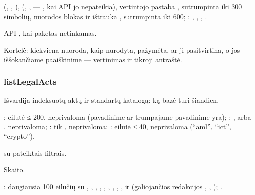\begin{description}[style=multiline, leftmargin=19mm, labelwidth=17mm, labelsep=2mm,
  font=\sffamily\bfseries\footnotesize\color{ink}, itemsep=1pt, topsep=2pt, before=\raggedright]
    (, , ), 
    (, ,  --- , kai API jo nepateikia),
    vertintojo pastaba , sutrumpinta iki 300 simbolių, nuorodos blokas ir ištrauka
    , sutrumpinta iki 600; : , ,
    , .
  \item[Klaidos] API , kai paketas netinkamas.
  \item[Konsolė] Kortelė: kiekviena nuoroda, kaip nurodyta, pažymėta, ar ji pasitvirtina, o
    jos iššokančiame paaiškinime --- vertinimas ir tikroji antraštė.
\end{description}

\subsubsection{listLegalActs}\label{sec:tools:listLegalActs}
\begin{description}[style=multiline, leftmargin=19mm, labelwidth=17mm, labelsep=2mm,
  font=\sffamily\bfseries\footnotesize\color{ink}, itemsep=1pt, topsep=2pt, before=\raggedright]
  \item[Paskirtis] Išvardija indeksuotų aktų ir standartų katalogą: ką bazė turi šiandien.
  \item[Įvestis] : eilutė ≤ 200, neprivaloma (pavadinime ar trumpajame
    pavadinime yra); : ,  arba , neprivaloma;
    : tik , neprivaloma; : eilutė ≤ 40, neprivaloma
    (\enquote{aml}, \enquote{ict}, \enquote{crypto}).
  \item[Užklausos]  su pateiktais filtrais.
  \item[Pobūdis] Skaito.
  \item[Grąžina] : daugiausia 100 eilučių su , ,
    , , , , ,
    , ,  ir  (galiojančios
    redakcijos , , ); .
\end{description}

